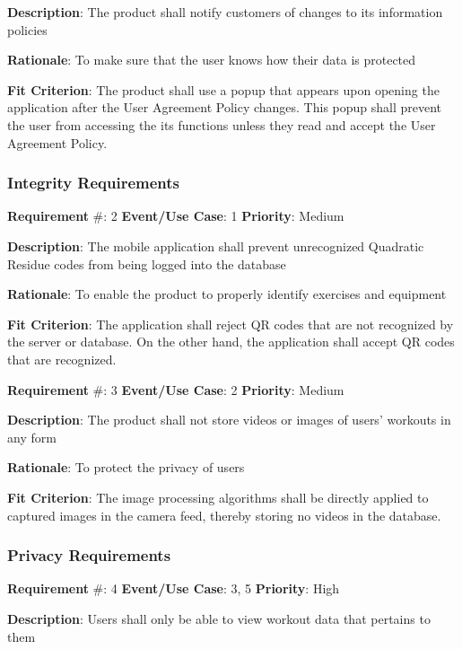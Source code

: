 \documentclass{article}
\newcommand\tab{\hspace*{2cm}}
\begin{document}
\textbf{Description}: The product shall notify customers of changes to its information policies

\textbf{Rationale}: To make sure that the user knows how their data is protected

\textbf{Fit Criterion}: The product shall use a popup that appears upon opening the application after the User Agreement Policy changes. This popup shall prevent the user from accessing the its functions unless they read and accept the User Agreement Policy.

\medskip

\subsubsection{Integrity Requirements}
\textbf{Requirement} \#: 2 \tab \textbf{Event/Use Case}: 1 \tab \textbf{Priority}: Medium

\textbf{Description}: The mobile application shall prevent unrecognized Quadratic Residue codes from being logged into the database

\textbf{Rationale}: To enable the product to properly identify exercises and equipment

\textbf{Fit Criterion}: The application shall reject QR codes that are not recognized by the server or database. On the other hand, the application shall accept QR codes that are recognized.

\medskip


\textbf{Requirement} \#: 3 \tab \textbf{Event/Use Case}: 2 \tab \textbf{Priority}: Medium

\textbf{Description}: The product shall not store videos or images of users’ workouts in any form

\textbf{Rationale}: To protect the privacy of users

\textbf{Fit Criterion}: The image processing algorithms shall be directly applied to captured images in the camera feed, thereby storing no videos in the database.

\medskip

\subsubsection{Privacy Requirements}
\textbf{Requirement} \#: 4 \tab \textbf{Event/Use Case}: 3, 5 \tab \textbf{Priority}: High

\textbf{Description}: Users shall only be able to view workout data that pertains to them
\end{document}
